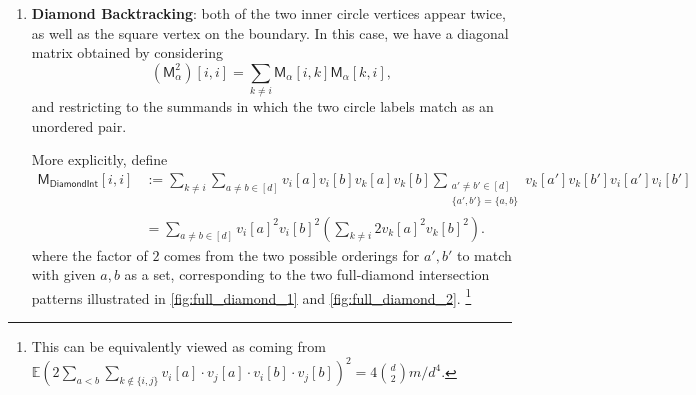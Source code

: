 \documentclass[12pt]{article}
\def \E {\mathbb{E}}
\newcommand{\gam}{\gamma}
\newcommand{\cm}{\mathsf{M} }
\begin{document}
 \begin{enumerate}
	\item \textbf{Diamond Backtracking}:
	 both of the two inner circle vertices appear twice, as well as the square vertex on the boundary. In this case, we have a diagonal matrix
%	 
obtained by considering
\[
    (\cm_\alpha^2)[i,i]
    =
    \sum_{k\neq i}\cm_\alpha[i,k]\cm_\alpha[k,i],
\]
and restricting to the summands in which the two circle labels match as an
unordered pair.

More explicitly, define
\[
\begin{aligned}
\cm_{\mathsf{DiamondInt}}[i,i]
&:=
\sum_{k\neq i}
\sum_{a\neq b\in[d]}
v_i[a]v_i[b]v_k[a]v_k[b]
\sum_{\substack{a'\neq b'\in[d]\\ \{a',b'\}=\{a,b\}}}
v_k[a']v_k[b']v_i[a']v_i[b']
\\
&=
\sum_{a\neq b\in[d]}
v_i[a]^2v_i[b]^2
\left(
    \sum_{k\neq i}2v_k[a]^2v_k[b]^2
\right).
\end{aligned}
\]
 where the factor of \(2\) comes from the two possible orderings for $a',b'$ to match with given $a,b$ as a set, corresponding to the two full-diamond intersection patterns illustrated in \cref{fig:full_diamond_1} and \cref{fig:full_diamond_2}.
	 \footnote{This can be equivalently viewed as coming from $ \E \left(2\sum_{a<b} \sum_{k\notin \{i,j\}} v_i[a]\cdot v_j[a]\cdot v_i[b]\cdot v_j[b] \right)^2 = 4 \binom{d}{2}m/d^4.$ }
	 

\end{enumerate}
\end{document}
